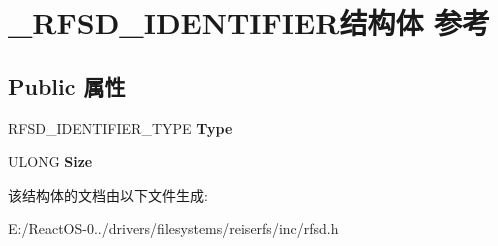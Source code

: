 \hypertarget{struct___r_f_s_d___i_d_e_n_t_i_f_i_e_r}{}\section{\+\_\+\+R\+F\+S\+D\+\_\+\+I\+D\+E\+N\+T\+I\+F\+I\+E\+R结构体 参考}
\label{struct___r_f_s_d___i_d_e_n_t_i_f_i_e_r}
\subsection*{Public 属性}
\begin{DoxyCompactItemize}
\item 
\mbox{\label{struct___r_f_s_d___i_d_e_n_t_i_f_i_e_r_a8bd2be041600537e1a3452765cc40d89}} 
R\+F\+S\+D\+\_\+\+I\+D\+E\+N\+T\+I\+F\+I\+E\+R\+\_\+\+T\+Y\+PE {\bfseries Type}
\item 
\mbox{\label{struct___r_f_s_d___i_d_e_n_t_i_f_i_e_r_aee5ec92fbf33ee7205b1a132ca766ef5}} 
U\+L\+O\+NG {\bfseries Size}
\end{DoxyCompactItemize}


该结构体的文档由以下文件生成\+:\begin{DoxyCompactItemize}
\item 
E\+:/\+React\+O\+S-\/0../drivers/filesystems/reiserfs/inc/rfsd.\+h\end{DoxyCompactItemize}
